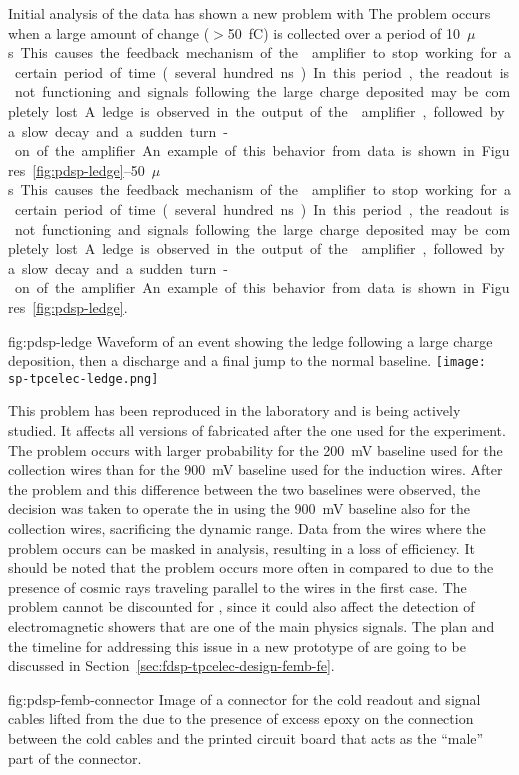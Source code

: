 Initial analysis of the  data has shown a new problem 
with  The problem occurs when a large amount of 
change ($>$\SI{50}{fC}) is collected over a period of \SIrange{10}{50}{$\mu$s}.
This causes the feedback mechanism of the  amplifier 
to stop working for a certain period of time (several hundred ns). 
In this period, the readout is not functioning and signals following 
the large charge deposited may be completely lost. A ledge is observed 
in the output of the  amplifier, followed by a slow decay 
and a sudden turn-on of the amplifier. An example of this behavior 
from data is shown in Figures~\ref{fig:pdsp-ledge}.

\begin{dunefigure}
{fig:pdsp-ledge}
{Waveform of an event showing the ledge following a large charge 
deposition, then a discharge and a final jump to the normal baseline.}
\texttt{[image: sp-tpcelec-ledge.png]}
\end{dunefigure}

This problem has been reproduced in the laboratory and is being actively 
studied. It affects all versions of  fabricated after 
the one used for the  experiment. The problem occurs 
with larger probability for the \SI{200}{mV} baseline used for the collection
wires than for the \SI{900}{mV} baseline used for the induction wires.
After the problem and this difference between the two baselines were 
observed, the decision was taken to operate the  in  
using the \SI{900}{mV} baseline also for the collection wires, sacrificing
the dynamic range. Data from the wires where the problem occurs can
be masked in analysis, resulting in a loss of efficiency. It should be
noted that the problem occurs more often in  compared to
 due to the presence of cosmic rays traveling parallel
to the  wires in the first case. The problem cannot be 
discounted for , since it could also affect the detection
of electromagnetic showers that are one of the main physics signals.
The plan and the timeline for addressing this issue in a new prototype
of  are going to be discussed in 
Section~\ref{sec:fdsp-tpcelec-design-femb-fe}.


\begin{dunefigure}
{fig:pdsp-femb-connector}
{Image of a connector for the cold readout and signal cables lifted from
the  due to the presence of excess epoxy on the 
connection between the cold cables and the printed circuit board
that acts as the ``male'' part of the connector.}
\end{dunefigure}


